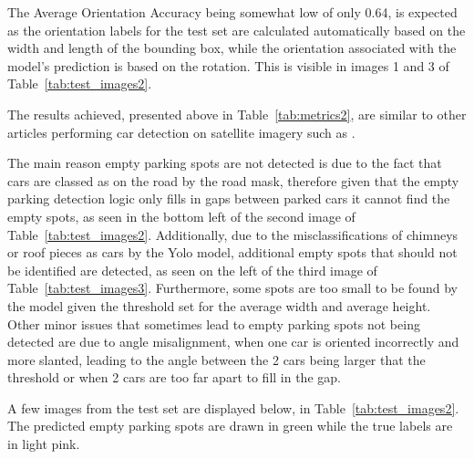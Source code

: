 The Average Orientation Accuracy being somewhat low of only 0.64, is expected as the orientation labels for the test set are calculated automatically based on the width and length of the bounding box, while the orientation associated with the model’s prediction is based on the rotation. This is visible in images 1 and 3 of Table~\ref{tab:test_images2}.

The results achieved, presented above in Table~\ref{tab:metrics2}, are similar to other articles performing car detection on satellite imagery such as \cite{similarresults}.

The main reason empty parking spots are not detected is due to the fact that cars are classed as on the road by the road mask, therefore given that the empty parking detection logic only fills in gaps between parked cars it cannot find the empty spots, as seen in the bottom left of the second image of Table~\ref{tab:test_images2}.
Additionally, due to the misclassifications of chimneys or roof pieces as cars by the Yolo model, additional empty spots that should not be identified are detected, as seen on the left of the third image of Table~\ref{tab:test_images3}.
Furthermore, some spots are too small to be found by the model given the threshold set for the average width and average height.\\
Other minor issues that sometimes lead to empty parking spots not being detected are due to angle misalignment, when one car is oriented incorrectly and more slanted, leading to the angle between the 2 cars being larger that the threshold or when 2 cars are too far apart to fill in the gap.

A few images from the test set are displayed below, in Table~\ref{tab:test_images2}.
The predicted empty parking spots are drawn in green while the true labels are in light pink.

